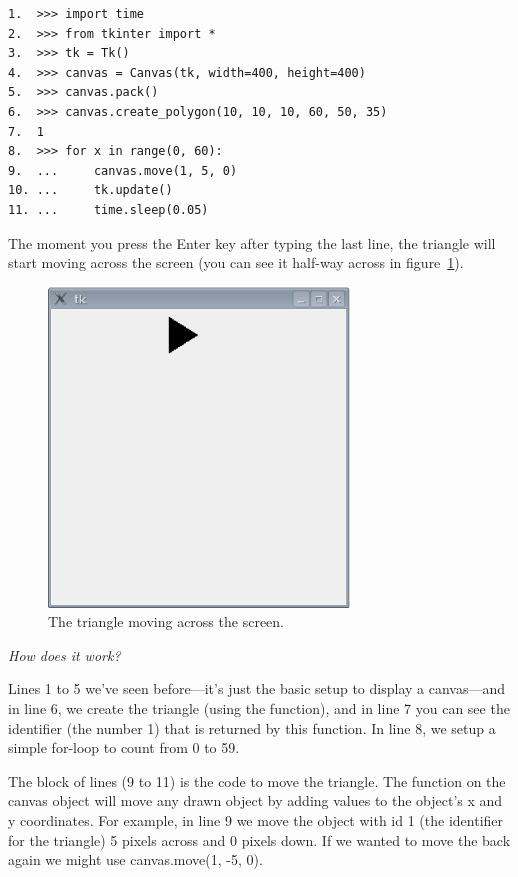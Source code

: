 \begin{listingignore}
\begin{verbatim}
1.  >>> import time
2.  >>> from tkinter import *
3.  >>> tk = Tk()
4.  >>> canvas = Canvas(tk, width=400, height=400)
5.  >>> canvas.pack()
6.  >>> canvas.create_polygon(10, 10, 10, 60, 50, 35)
7.  1
8.  >>> for x in range(0, 60):
9.  ...     canvas.move(1, 5, 0)
10. ...     tk.update()
11. ...     time.sleep(0.05)
\end{verbatim}
\end{listingignore}

The moment you press the Enter key after typing the last line, the triangle will start moving across the screen (you can see it half-way across in figure~\ref{fig44}).

\begin{figure}
\begin{center}
\includegraphics[width=80mm]{eps/figure44.eps}
\end{center}
\caption{The triangle moving across the screen.}\label{fig44}
\end{figure}

\par
\emph{How does it work?}
\par
Lines 1 to 5 we've seen before---it's just the basic setup to display a canvas---and in line 6, we create the triangle (using the  function), and in line 7 you can see the identifier (the number 1) that is returned by this function. In line 8, we setup a simple for-loop to count from 0 to 59.

The block of lines (9 to 11) is the code to move the triangle. The  function on the canvas object will move any drawn object by adding values to the object's x and y coordinates. For example, in line 9 we move the object with id 1 (the identifier for the triangle) 5 pixels across and 0 pixels down. If we wanted to move the back again we might use canvas.move(1, -5, 0).
 
